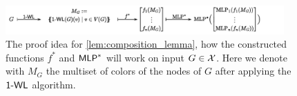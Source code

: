 \begin{figure}[H]
    \centering
    \includegraphics[width=0.95\textwidth]{Figures/proof_sketch_wlnn_composition.pdf}
    \caption{The proof idea for \autoref{lem:composition_lemma}, how the constructed functions $f^*$ and $\textsf{MLP}^*$ will work on input $G \in \mathcal{X}$. Here we denote with $M_G$ the multiset of colors of the nodes of $G$ after applying the $\textsf{1-WL}$ algorithm.}
    \label{fig:proof_idea_parallelism}
\end{figure}
    


